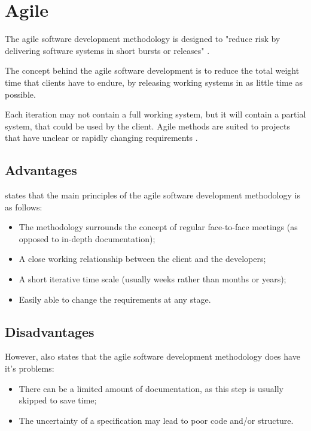 \section{Agile}

The agile software development methodology is designed to "reduce risk by 
delivering software systems in short bursts or releases" \citep{dawson09}. 

The concept behind the agile software development is to reduce the total weight
time that clients have to endure, by releasing working systems in as little 
time as possible. 

Each iteration may not contain a full working system, but it will contain a 
partial system, that could be used by the client. Agile methods are suited to 
projects that have unclear or rapidly changing requirements \citep{dawson09}.

\subsection{Advantages}
\citet{dawson09} states that the main principles of the agile software 
development methodology is as follows:

\begin{itemize}
	\item The methodology surrounds the concept of regular face-to-face meetings
        (as opposed to in-depth documentation);
	\item A close working relationship between the client and the developers;
	\item A short iterative time scale (usually weeks rather than months or 
        years);
	\item Easily able to change the requirements at any stage.
\end{itemize}

\subsection{Disadvantages}
However, \citet{dawson09} also states that the agile software development 
methodology does have it's problems:
\begin{itemize}
	\item There can be a limited amount of documentation, as this step is usually 
        skipped to save time;
  \item The uncertainty of a specification may lead to poor code and/or 
        structure.
\end{itemize}